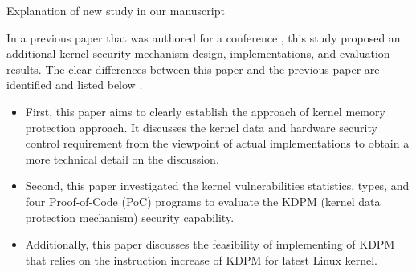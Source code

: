 \documentclass[11pt,a4paper]{article}
\begin{document}


\begin{itembox}[l]{Explanation of new study in our manuscript}

In a previous paper that was authored for a conference \cite{kuzuno22iwsec},
this study proposed an additional kernel security mechanism design,
implementations, and evaluation results.  The clear differences between this
paper and the previous paper are identified and listed below \cite{kuzuno22iwsec}.

\begin{itemize}
  \item First, this paper aims to clearly establish the approach of
  kernel memory protection approach. It discusses the kernel data and hardware
  security control requirement from the viewpoint of actual implementations
  to obtain a more technical detail on the discussion.

  \item Second, this paper investigated the kernel vulnerabilities statistics,
  types, and four Proof-of-Code (PoC) programs to evaluate the 
  KDPM (kernel data protection mechanism) security capability.


\item Additionally, this paper discusses the feasibility of implementing of KDPM
  that relies on the instruction increase of KDPM for latest Linux kernel.

\end{itemize}
  

\end{itembox}
\end{document}
